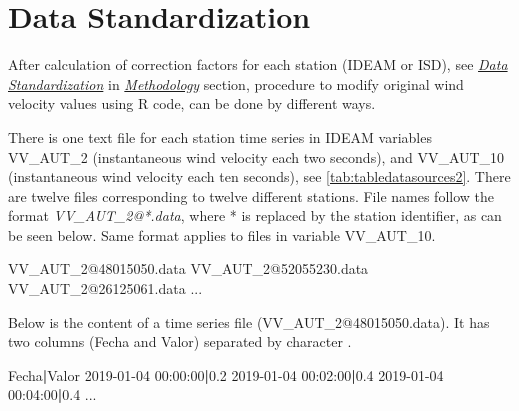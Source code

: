 \documentclass[12pt,twoside]{reedthesis}
\newenvironment{Shaded}{\begin{snugshade}}{\end{snugshade}}
\newcommand{\ExtensionTok}[1]{#1}
\newcommand{\KeywordTok}[1]{\textcolor[rgb]{0.13,0.29,0.53}{\textbf{#1}}}
\newcommand{\NormalTok}[1]{#1}
\begin{document}
\hypertarget{data-standardization-1}{%
\section{Data Standardization}\label{data-standardization-1}}

After calculation of correction factors for each station (IDEAM or ISD), see \emph{\protect\hyperlink{rmd-standardization}{Data Standardization}} in \emph{\protect\hyperlink{rmd-method}{Methodology}} section, procedure to modify original wind velocity values using R code, can be done by different ways.

There is one text file for each station time series in IDEAM variables VV\_AUT\_2 (instantaneous wind velocity each two seconds), and VV\_AUT\_10 (instantaneous wind velocity each ten seconds), see \ref{tab:tabledatasources2}. There are twelve files corresponding to twelve different stations. File names follow the format \emph{VV\_AUT\_2@*.data}, where * is replaced by the station identifier, as can be seen below. Same format applies to files in variable VV\_AUT\_10.

\scriptsize

\vspace{0.4cm}
\begin{Shaded}
\begin{Highlighting}[]
      \ExtensionTok{VV_AUT_2@48015050.data}
      \ExtensionTok{VV_AUT_2@52055230.data}
      \ExtensionTok{VV_AUT_2@26125061.data}
      \ExtensionTok{...}
\end{Highlighting}
\end{Shaded}
\normalsize

Below is the content of a time series file (VV\_AUT\_2@48015050.data). It has two columns (Fecha and Valor) separated by character \textbar.

\scriptsize

\vspace{0.4cm}
\begin{Shaded}
\begin{Highlighting}[]
      \ExtensionTok{Fecha}\KeywordTok{|}\ExtensionTok{Valor}
      \ExtensionTok{2019-01-04}\NormalTok{ 00:00:00}\KeywordTok{|}\ExtensionTok{0.2}
      \ExtensionTok{2019-01-04}\NormalTok{ 00:02:00}\KeywordTok{|}\ExtensionTok{0.4}
      \ExtensionTok{2019-01-04}\NormalTok{ 00:04:00}\KeywordTok{|}\ExtensionTok{0.4}
      \ExtensionTok{...}
\end{Highlighting}
\end{Shaded}
\normalsize
\end{document}
